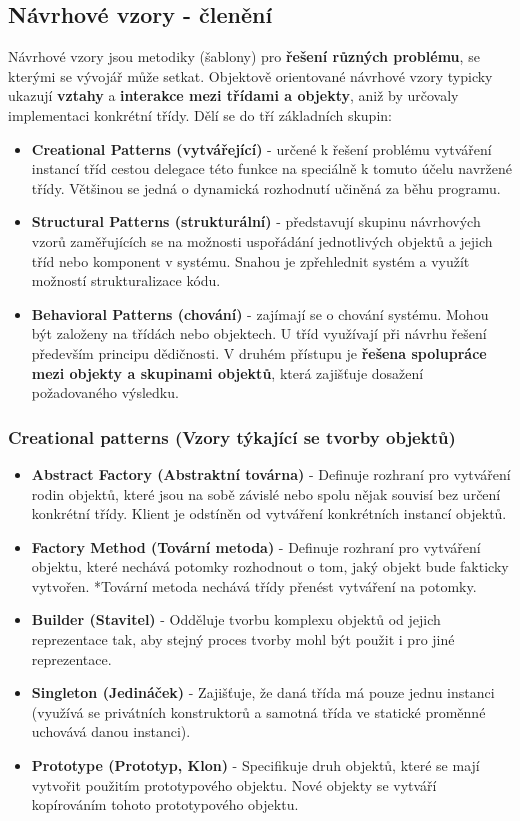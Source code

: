 \subsection{Návrhové vzory - členění}
Návrhové vzory jsou metodiky (šablony) pro \textbf{řešení různých problému}, se kterými se vývojář může setkat. Objektově orientované návrhové vzory typicky ukazují \textbf{vztahy} a \textbf{interakce mezi třídami a objekty}, aniž by určovaly implementaci konkrétní třídy. Dělí se do tří základních skupin:
\begin{itemize}
\item \textbf{Creational Patterns (vytvářející)} - určené k řešení problému vytváření instancí tříd cestou delegace této funkce na speciálně k tomuto účelu navržené třídy. Většinou se jedná o dynamická rozhodnutí učiněná za běhu programu.
\item \textbf{Structural Patterns (strukturální)} - představují skupinu návrhových vzorů zaměřujících se na možnosti uspořádání jednotlivých objektů a jejich tříd nebo komponent v systému. Snahou je zpřehlednit systém a využít možností strukturalizace kódu.
\item \textbf{Behavioral Patterns (chování)} - zajímají se o chování systému. Mohou být založeny na třídách nebo objektech. U tříd využívají při návrhu řešení především principu dědičnosti. V druhém přístupu je \textbf{řešena spolupráce mezi objekty a skupinami objektů}, která zajišťuje dosažení požadovaného výsledku.
\end{itemize}

\subsubsection{Creational patterns (Vzory týkající se tvorby objektů)}
\begin{itemize}
	\item \textbf{Abstract Factory (Abstraktní továrna)} - Definuje rozhraní pro vytváření rodin objektů, které jsou na sobě závislé nebo spolu nějak souvisí bez určení konkrétní třídy. Klient je odstíněn od vytváření konkrétních instancí objektů.
	\item \textbf{Factory Method (Tovární metoda)} - Definuje rozhraní pro vytváření objektu, které nechává potomky rozhodnout o tom, jaký objekt bude fakticky vytvořen. *Tovární metoda nechává třídy přenést vytváření na potomky.
	\item \textbf{Builder (Stavitel)} - Odděluje tvorbu komplexu objektů od jejich reprezentace tak, aby stejný proces tvorby mohl být použit i pro jiné reprezentace.
	\item \textbf{Singleton (Jedináček)} - Zajišťuje, že daná třída má pouze jednu instanci (využívá se privátních konstruktorů a samotná třída ve statické proměnné uchovává danou instanci).
	\item \textbf{Prototype (Prototyp, Klon)} - Specifikuje druh objektů, které se mají vytvořit použitím prototypového objektu. Nové objekty se vytváří kopírováním tohoto prototypového objektu.
\end{itemize}

